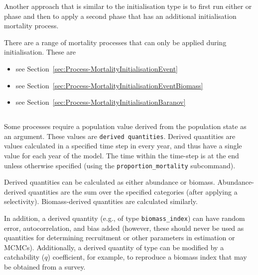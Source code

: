 \ifAgeBased
Another approach that is similar to the  initialisation type is to first run either  or  phase and then to apply a second  phase that has an additional initialisation mortality process.

There are a range of mortality processes that can only be applied during initialisation. These are

\begin{itemize}
	\item {} see Section~\ref{sec:Process-MortalityInitialisationEvent}
	\item {} see Section~\ref{sec:Process-MortalityInitialisationEventBiomass}
	\item {} see  Section~\ref{sec:Process-MortalityInitialisationBaranov}
\end{itemize}
\fi %

\subsection{}\label{sec:Process}

\ifAgeBased

\else

\fi 

\subsection{\label{sec:DerivedQuantity}}

Some processes require a population value derived from the population state as an argument. These values are \texttt{derived quantities}. Derived quantities are values calculated in a specified time step in every year, and thus have a single value for each year of the model. The time within the time-step is at the end unless otherwise specified (using the \texttt{proportion\_mortality} subcommand).

Derived quantities can be calculated as either abundance or biomass. Abundance-derived quantities are the sum over the specified categories (after applying a selectivity)\label{sec:DerivedQuantity-Abundance}. Biomass-derived quantities are calculated similarly\label{sec:DerivedQuantity-Biomass}. 

In addition, a derived quantity (e.g., of type \texttt{biomass\_index}) can have random error, autocorrelation, and bias added (however, these should never be used as quantities for determining recruitment or other parameters in estimation or MCMCs).\label{sec:DerivedQuantity-BiomassIndex} Additionally, a derived quantity of type  can be modified by a catchability ($q$) coefficient, for example, to reproduce a biomass index that may be obtained from a survey.

